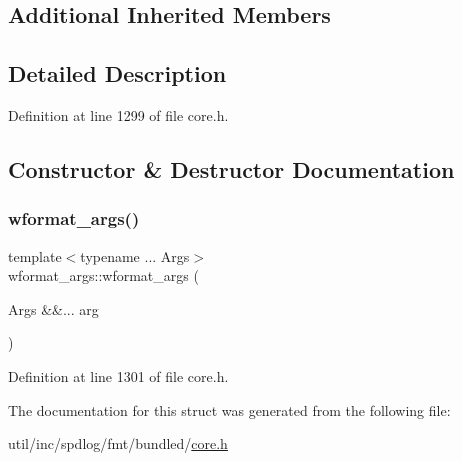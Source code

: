 \subsection*{Additional Inherited Members}


\subsection{Detailed Description}


Definition at line 1299 of file core.\+h.



\subsection{Constructor \& Destructor Documentation}
\mbox{\label{structwformat__args_ab10e8e30aa7400efdc898c84a8130930}} 
\subsubsection{\texorpdfstring{wformat\+\_\+args()}{wformat\_args()}}
{\footnotesize\ttfamily template$<$typename ... Args$>$ \\
wformat\+\_\+args\+::wformat\+\_\+args (\begin{DoxyParamCaption}\item[{Args \&\&...}]{arg }\end{DoxyParamCaption})\hspace{0.3cm}{\ttfamily [inline]}}



Definition at line 1301 of file core.\+h.



The documentation for this struct was generated from the following file\+:\begin{DoxyCompactItemize}
\item 
util/inc/spdlog/fmt/bundled/\hyperlink{core_8h}{core.\+h}\end{DoxyCompactItemize}
